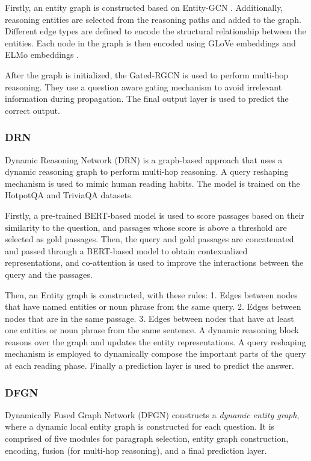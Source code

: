 \documentclass[sigplan,screen,nonacm]{acmart}
\begin{document}
Firstly, an entity graph is constructed based on Entity-GCN \cite{RN117}. Additionally, reasoning entities are selected from the reasoning paths and added to the 
graph. Different edge types are defined to encode the structural relationship between the entities. Each node in the graph is then encoded using
GLoVe embeddings \cite{RN98} and ELMo embeddings \cite{RN183}.

After the graph is initialized, the Gated-RGCN is used to perform multi-hop reasoning. They use a question aware gating mechanism to avoid irrelevant information
during propagation. The final output layer is used to predict the correct output.

\subsubsection{DRN}
Dynamic Reasoning Network (DRN) \cite{RN142} is a graph-based approach that uses a dynamic reasoning graph to perform multi-hop reasoning.
A query reshaping mechanism is used to mimic human reading habits. The model is trained on the HotpotQA \cite{RN116} and TriviaQA \cite{RN125} datasets.

Firstly, a pre-trained BERT-based model \cite{RN153} is used to score passages based on their similarity to the question, and passages whose score
is above a threshold are selected as gold passages. Then, the query and gold passages are concatenated and passed through a BERT-based model to obtain
contexualized representations, and co-attention is used to improve the interactions between the query and the passages.

Then, an Entity graph is constructed, with these rules: 1. Edges between nodes that have named entities or noun phrase from the same query.
2. Edges between nodes that are in the same passage. 3. Edges between nodes that have at least one entities or noun phrase from the same sentence.
A dynamic reasoning block reasons over the graph and updates the entity representations. A query reshaping mechanism is employed to dynamically 
compose the important parts of the query at each reading phase. Finally a prediction layer is used to predict the answer.

\subsubsection{DFGN}
Dynamically Fused Graph Network (DFGN) \cite{RN122} constructs a \emph{dynamic entity graph}, where a dynamic local entity graph is 
constructed for each question. It is comprised of five modules for paragraph selection, entity graph construction, encoding, fusion 
(for multi-hop reasoning), and a final prediction layer.
\end{document}
